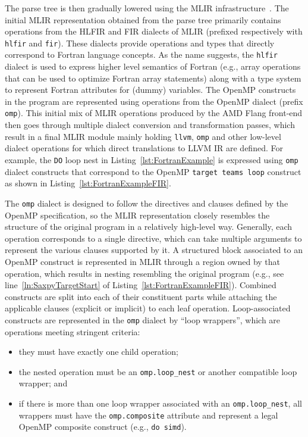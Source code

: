 \documentclass[acmtog,natbib=false]{acmart}
\newcommand{\code}[1]{\texttt{#1}\xspace}
\begin{document}
The parse tree is then gradually lowered using the \ac{MLIR} infrastructure~\cite{mlir}. The initial \ac{MLIR} representation obtained from the parse tree primarily contains operations from the \ac{HLFIR} and \ac{FIR} dialects of \ac{MLIR} (prefixed respectively with \code{hlfir} and \code{fir}).
These dialects provide operations and types that directly correspond to Fortran language concepts.
As the name suggests, the \code{hlfir} dialect is used to express higher level semantics of Fortran (e.g., array operations that can be used to optimize Fortran array statements) along with a type system to represent Fortran attributes for (dummy) variables.
The OpenMP constructs in the program are represented using operations from the OpenMP dialect (prefix \code{omp}).
This initial mix of \ac{MLIR} operations produced by the AMD Flang front-end then goes through multiple dialect conversion and transformation passes, which result in a final \ac{MLIR} module mainly holding \code{llvm}, \code{omp} and other low-level dialect operations for which direct translations to LLVM \ac{IR} are defined.
For example, the \code{DO} loop nest in Listing~\ref{lst:FortranExample} is expressed using \code{omp} dialect constructs that correspond to the OpenMP \code{target teams loop} construct as shown in Listing~\ref{lst:FortranExampleFIR}.

The \code{omp} dialect is designed to follow the directives and clauses defined by the OpenMP specification, so the \ac{MLIR} representation closely resembles the structure of the original program in a relatively high-level way.
Generally, each operation corresponds to a single directive, which can take multiple arguments to represent the various clauses supported by it.
A structured block associated to an OpenMP construct is represented in \ac{MLIR} through a region owned by that operation, which results in nesting resembling the original program (e.g., see line~\ref{ln:SaxpyTargetStart} of Listing~\ref{lst:FortranExampleFIR}).
Combined constructs are split into each of their constituent parts while attaching the applicable clauses (explicit or implicit) to each leaf operation.
Loop-associated constructs are represented in the \code{omp} dialect by ``loop wrappers'', which are operations meeting stringent criteria:

\begin{itemize}
    \item they must have exactly one child operation;
    \item the nested operation must be an \code{omp.loop\_nest} or another compatible loop wrapper; and
    \item if there is more than one loop wrapper associated with an \code{omp.loop\_nest}, all wrappers must have the \code{omp.composite} attribute and represent a legal OpenMP composite construct (e.g., \code{do simd}).
\end{itemize}
\end{document}
